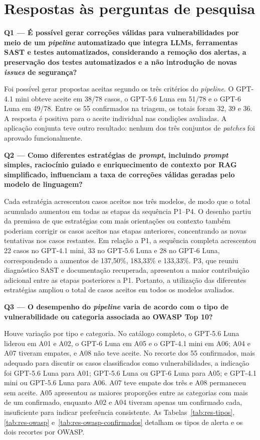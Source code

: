 \section{Respostas às perguntas de pesquisa}

\label{sec:res-perguntas}

\textbf{Q1 --- É possível gerar correções válidas para vulnerabilidades por meio de um \textit{pipeline} automatizado que integra LLMs, ferramentas SAST e testes automatizados, considerando a remoção dos alertas, a preservação dos testes automatizados e a não introdução de novas \textit{issues} de segurança?}\nopagebreak[4]

Foi possível gerar propostas aceitas segundo os três critérios do \textit{pipeline}. O GPT-4.1 mini obteve aceite em 38/78 casos, o GPT-5.6 Luna em 51/78 e o GPT-6 Luna em 49/78. Entre os 55 confirmados na triagem, os totais foram 32, 39 e 36. A resposta é positiva para o aceite individual nas condições avaliadas. A aplicação conjunta teve outro resultado: nenhum dos três conjuntos de \textit{patches} foi aprovado funcionalmente.

\textbf{Q2 --- Como diferentes estratégias de \textit{prompt}, incluindo \textit{prompt} simples, raciocínio guiado e enriquecimento de contexto por RAG simplificado, influenciam a taxa de correções válidas geradas pelo modelo de linguagem?}\nopagebreak[4]

Cada estratégia acrescentou casos aceitos nos três modelos, de modo que o total acumulado aumentou em todas as etapas da sequência P1--P4. O desenho partiu da premissa de que estratégias com mais orientações ou contexto também poderiam corrigir os casos aceitos nas etapas anteriores, concentrando as novas tentativas nos casos restantes. Em relação a P1, a sequência completa acrescentou 22 casos no GPT-4.1 mini, 33 no GPT-5.6 Luna e 28 no GPT-6 Luna, correspondendo a aumentos de 137,50\%, 183,33\% e 133,33\%. P3, que reuniu diagnóstico SAST e documentação recuperada, apresentou a maior contribuição adicional entre as etapas posteriores a P1. Portanto, a utilização das diferentes estratégias ampliou o total de casos aceitos em todos os modelos avaliados.

\textbf{Q3 --- O desempenho do \textit{pipeline} varia de acordo com o tipo de vulnerabilidade ou categoria associada ao OWASP Top 10?}\nopagebreak[4]

Houve variação por tipo e categoria. No catálogo completo, o GPT-5.6 Luna liderou em A01 e A02, o GPT-6 Luna em A05 e o GPT-4.1 mini em A06; A04 e A07 tiveram empates, e A08 não teve aceite. No recorte dos 55 confirmados, mais adequado para discutir os casos classificados como vulnerabilidades, a indicação foi GPT-5.6 Luna para A01; GPT-5.6 Luna ou GPT-6 Luna para A05; e GPT-4.1 mini ou GPT-5.6 Luna para A06. A07 teve empate dos três e A08 permaneceu sem aceite. A05 apresentou as maiores proporções entre as categorias com mais de um confirmado, enquanto A02 e A04 tiveram apenas um confirmado cada, insuficiente para indicar preferência consistente. As Tabelas~\ref{tab:res-tipos}, \ref{tab:res-owasp} e~\ref{tab:res-owasp-confirmados} detalham os tipos de alerta e os dois recortes por OWASP.

